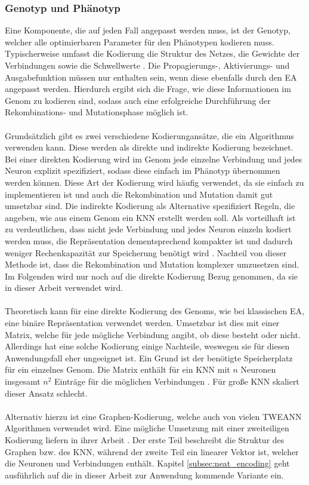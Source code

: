 \subsubsection{Genotyp und Phänotyp}
Eine Komponente, die auf jeden Fall angepasst werden muss, ist der Genotyp, welcher alle optimierbaren Parameter für den Phänotypen kodieren muss. Typischerweise umfasst die Kodierung die Struktur des Netzes, die Gewichte der Verbindungen sowie die Schwellwerte \cite{stanley2002evolving}. Die Propagierungs-, Aktivierungs- und Ausgabefunktion müssen nur enthalten sein, wenn diese ebenfalls durch den \ac{EA} angepasst werden. Hierdurch ergibt sich die Frage, wie diese Informationen im Genom zu kodieren sind, sodass auch eine erfolgreiche Durchführung der Rekombinations- und Mutationsphase möglich ist. 
\\\\
Grundsätzlich gibt es zwei verschiedene Kodierungansätze, die ein Algorithmus verwenden kann. Diese werden als direkte und indirekte Kodierung bezeichnet. Bei einer direkten Kodierung wird im Genom jede einzelne Verbindung und jedes Neuron explizit spezifiziert, sodass diese einfach im Phänotyp übernommen werden können. Diese Art der Kodierung wird häufig verwendet, da sie einfach zu implementieren ist und auch die Rekombination und Mutation damit gut umsetzbar sind. Die indirekte Kodierung als Alternative spezifiziert Regeln, die angeben, wie aus einem Genom ein \ac{KNN} erstellt werden soll. Als vorteilhaft ist zu verdeutlichen, dass nicht jede Verbindung und jedes Neuron einzeln kodiert werden muss, die Repräsentation dementsprechend kompakter ist und dadurch weniger Rechenkapazität zur Speicherung benötigt wird \cite{stanley2002evolving}. Nachteil von dieser Methode ist, dass die Rekombination und Mutation komplexer umzusetzen sind. Im Folgenden wird nur noch auf die direkte Kodierung Bezug genommen, da sie in dieser Arbeit verwendet wird.
\\\\
Theoretisch kann für eine direkte Kodierung des Genoms, wie bei klassischen \ac{EA}, eine binäre Repräsentation verwendet werden. Umsetzbar ist dies mit einer Matrix, welche für jede mögliche Verbindung angibt, ob diese besteht oder nicht. Allerdings hat eine solche Kodierung einige Nachteile, weswegen sie für diesen Anwendungsfall eher ungeeignet ist. Ein Grund ist der benötigte Speicherplatz für ein einzelnes Genom. Die Matrix enthält für ein \ac{KNN} mit $n$ Neuronen insgesamt $n^2$ Einträge für die möglichen Verbindungen \cite{stanley2002evolving}. Für große \ac{KNN} skaliert dieser Ansatz schlecht.
\\\\
Alternativ hierzu ist eine Graphen-Kodierung, welche auch von vielen \ac{TWEANN} Algorithmen verwendet wird. Eine mögliche Umsetzung mit einer zweiteiligen Kodierung liefern \citeauthor{pujol1998evolving} in ihrer Arbeit \cite{pujol1998evolving}. Der erste Teil beschreibt die Struktur des Graphen bzw. des \ac{KNN}, während der zweite Teil ein linearer Vektor ist, welcher die Neuronen und Verbindungen enthält. Kapitel \ref{subsec:neat_encoding} geht ausführlich auf die in dieser Arbeit zur Anwendung kommende Variante ein.

